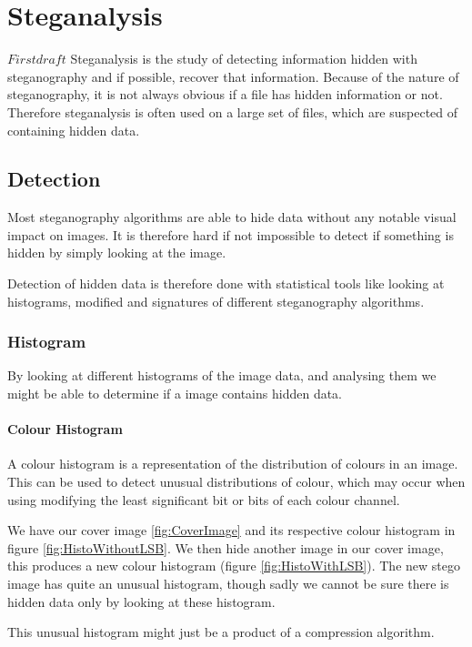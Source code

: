 \section{Steganalysis}$First draft$
Steganalysis is the study of detecting information hidden with steganography and if possible, recover that information.
Because of the nature of steganography, it is not always obvious if a file has hidden information or not.
Therefore steganalysis is often used on a large set of files, which are suspected of containing hidden data.

\subsection{Detection}
Most steganography algorithms are able to hide data without any notable visual impact on images.
It is therefore hard if not impossible to detect if something is hidden by simply looking at the image.

Detection of hidden data is therefore done with statistical tools like looking at histograms, modified and signatures of different steganography algorithms.

\subsubsection*{Histogram}
By looking at different histograms of the image data, and analysing them we might be able to determine if a image contains hidden data.

\paragraph*{Colour Histogram}
A colour histogram is a representation of the distribution of colours in an image. 
This can be used to detect unusual distributions of colour, which may occur when using modifying the least significant bit or bits of each colour channel.

We have our cover image \ref{fig:CoverImage} and its respective colour histogram in figure \ref{fig:HistoWithoutLSB}.
We then hide another image in our cover image, this produces a new colour histogram (figure \ref{fig:HistoWithLSB}).
The new stego image has quite an unusual histogram, though sadly we cannot be sure there is hidden data only by looking at these histogram.

This unusual histogram might just be a product of a compression algorithm.


